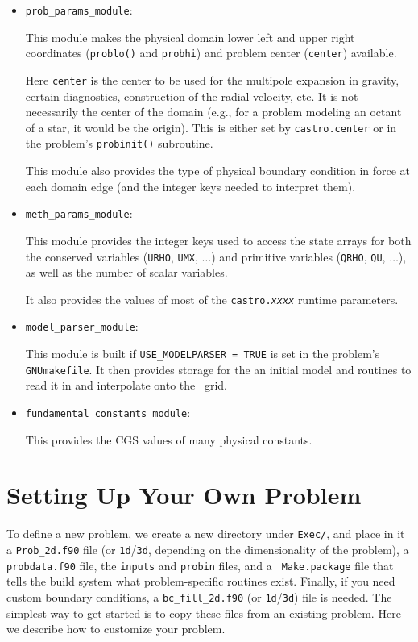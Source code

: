 \begin{itemize}
\item {\tt prob\_params\_module}:

  This module makes the physical domain lower left and upper right
  coordinates ({\tt problo()} and {\tt probhi}) and problem center
  ({\tt center}) available.

  Here {\tt center} is the center to
  be used for the multipole expansion in gravity, certain diagnostics,
  construction of the radial velocity, etc.  It is not necessarily
  the center of the domain (e.g., for a problem modeling an octant
  of a star, it would be the origin).  This is either set by
  {\tt castro.center} or in the problem's {\tt probinit()}
  subroutine.

  This module also provides the type of physical boundary
  condition in force at each domain edge (and the integer
  keys needed to interpret them).

\item {\tt meth\_params\_module}:

  This module provides the integer keys used to access the state
  arrays for both the conserved variables ({\tt URHO}, {\tt UMX}, $\ldots$)
  and primitive variables ({\tt QRHO}, {\tt QU}, $\ldots$), as well
  as the number of scalar variables.

  It also provides the values of most of the {\tt castro.{\em xxxx}}
  runtime parameters.

\item {\tt model\_parser\_module}:

  This module is built if {\tt USE\_MODELPARSER = TRUE} is set in the
  problem's {\tt GNUmakefile}.  It then provides storage for the an
  initial model and routines to read it in and interpolate onto the
  \castro\ grid.

\item {\tt fundamental\_constants\_module}:

  This provides the CGS values of many physical constants.

\end{itemize}



\section{Setting Up Your Own Problem}

To define a new problem, we create a new directory under {\tt Exec/},
and place in it a {\tt Prob\_2d.f90} file (or {\tt 1d}/{\tt 3d},
depending on the dimensionality of the problem), a {\tt probdata.f90}
file, the {\tt inputs} and {\tt probin} files, and a {\tt
  Make.package} file that tells the build system what problem-specific
routines exist.  Finally, if you need custom boundary conditions, a
{\tt bc\_fill\_2d.f90} (or {\tt 1d}/{\tt 3d}) file is needed.  The
simplest way to get started is to copy these files from an existing
problem.  Here we describe how to customize your problem.


